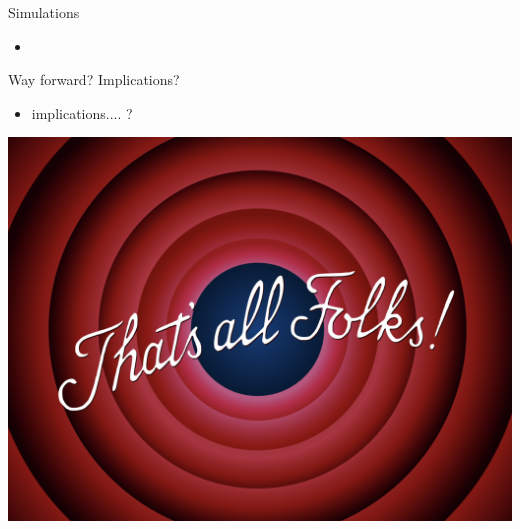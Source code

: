 \documentclass[xcolor=table,handout]{beamer}
\begin{document}
\begin{frame}{Simulations}
\begin{itemize} \item
\end{itemize}
\end{frame}

%
\begin{frame}{Way forward? Implications?}
\begin{itemize}
	\item implications.... ? 
\end{itemize}
\end{frame}

\begin{frame}
\includegraphics[scale = 0.4]{./img/end.png}
\end{frame}
\end{document}
